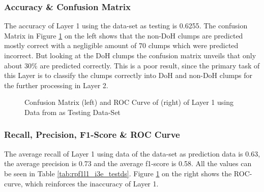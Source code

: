 \subsubsection{Accuracy \& Confusion Matrix}
The accuracy of Layer 1 using the data-set \cite{ieee_dataset} as testing is 0.6255. The confusion Matrix in Figure \ref{fig:con_roc_l1_i3e_test} on the left shows that the non-DoH clumps are predicted mostly correct with a negligible amount of 70 clumps which were predicted incorrect. But looking at the DoH clumps the confusion matrix unveils that only about 30\% are predicted correctly. This is a poor result, since the primary task of this Layer is to classify the clumps correctly into DoH and non-DoH clumps for the further processing in Layer 2.

\begin{figure}[ht]
\centering
{}\hspace{1.0cm}
\caption{Confusion Matrix (left) and ROC Curve of (right) of Layer 1 using Data from \cite{ieee_dataset} as Testing Data-Set}
\label{fig:con_roc_l1_i3e_test}
\end{figure}

\subsubsection{Recall, Precision, F1-Score \& ROC Curve}
The average recall of Layer 1 using data of the data-set \cite{ieee_dataset} as prediction data is 0.63, the average precision is 0.73 and the average f1-score is 0.58. All the values can be seen in Table \ref{tab:rpf1l1_i3e_testds}. Figure \ref{fig:con_roc_l1_i3e_test} on the right shows the ROC-curve, which reinforces the inaccuracy of Layer 1.

